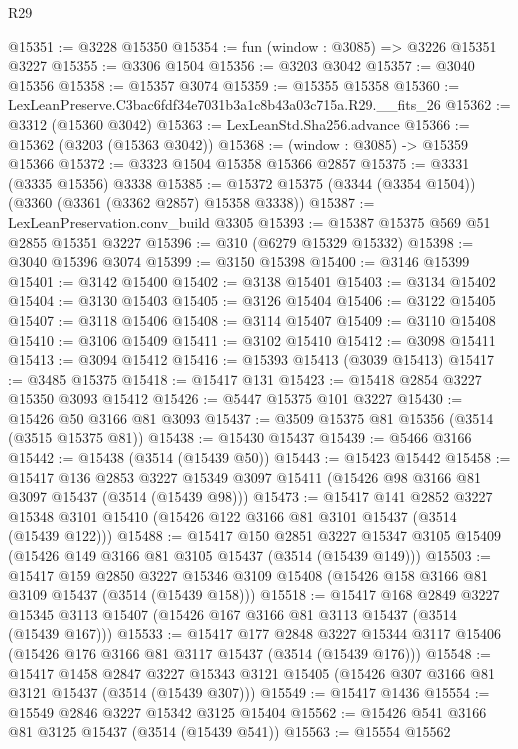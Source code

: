 \begin{lexlean}{R29}
\begin{coremodule}
@15351 := @3228 @15350
@15354 := fun (window : @3085) => @3226 @15351 @3227
@15355 := @3306 @1504
@15356 := @3203 @3042
@15357 := @3040 @15356
@15358 := @15357 @3074
@15359 := @15355 @15358
@15360 := LexLeanPreserve.C3bac6fdf34e7031b3a1c8b43a03c715a.R29.__fits_26
@15362 := @3312 (@15360 @3042)
@15363 := LexLeanStd.Sha256.advance
@15366 := @15362 (@3203 (@15363 @3042))
@15368 := (window : @3085) -> @15359 @15366
@15372 := @3323 @1504 @15358 @15366 @2857
@15375 := @3331 (@3335 @15356) @3338
@15385 := @15372 @15375 (@3344 (@3354 @1504)) (@3360 (@3361 (@3362 @2857) @15358 @3338))
@15387 := LexLeanPreservation.conv_build @3305
@15393 := @15387 @15375 @569 @51 @2855 @15351 @3227
@15396 := @310 (@6279 @15329 @15332)
@15398 := @3040 @15396 @3074
@15399 := @3150 @15398
@15400 := @3146 @15399
@15401 := @3142 @15400
@15402 := @3138 @15401
@15403 := @3134 @15402
@15404 := @3130 @15403
@15405 := @3126 @15404
@15406 := @3122 @15405
@15407 := @3118 @15406
@15408 := @3114 @15407
@15409 := @3110 @15408
@15410 := @3106 @15409
@15411 := @3102 @15410
@15412 := @3098 @15411
@15413 := @3094 @15412
@15416 := @15393 @15413 (@3039 @15413)
@15417 := @3485 @15375
@15418 := @15417 @131
@15423 := @15418 @2854 @3227 @15350 @3093 @15412
@15426 := @5447 @15375 @101 @3227
@15430 := @15426 @50 @3166 @81 @3093
@15437 := @3509 @15375 @81 @15356 (@3514 (@3515 @15375 @81))
@15438 := @15430 @15437
@15439 := @5466 @3166
@15442 := @15438 (@3514 (@15439 @50))
@15443 := @15423 @15442
@15458 := @15417
    @136
    @2853
    @3227
    @15349
    @3097
    @15411
    (@15426 @98 @3166 @81 @3097 @15437 (@3514 (@15439 @98)))
@15473 := @15417
    @141
    @2852
    @3227
    @15348
    @3101
    @15410
    (@15426 @122 @3166 @81 @3101 @15437 (@3514 (@15439 @122)))
@15488 := @15417
    @150
    @2851
    @3227
    @15347
    @3105
    @15409
    (@15426 @149 @3166 @81 @3105 @15437 (@3514 (@15439 @149)))
@15503 := @15417
    @159
    @2850
    @3227
    @15346
    @3109
    @15408
    (@15426 @158 @3166 @81 @3109 @15437 (@3514 (@15439 @158)))
@15518 := @15417
    @168
    @2849
    @3227
    @15345
    @3113
    @15407
    (@15426 @167 @3166 @81 @3113 @15437 (@3514 (@15439 @167)))
@15533 := @15417
    @177
    @2848
    @3227
    @15344
    @3117
    @15406
    (@15426 @176 @3166 @81 @3117 @15437 (@3514 (@15439 @176)))
@15548 := @15417
    @1458
    @2847
    @3227
    @15343
    @3121
    @15405
    (@15426 @307 @3166 @81 @3121 @15437 (@3514 (@15439 @307)))
@15549 := @15417 @1436
@15554 := @15549 @2846 @3227 @15342 @3125 @15404
@15562 := @15426 @541 @3166 @81 @3125 @15437 (@3514 (@15439 @541))
@15563 := @15554 @15562

\end{coremodule}
\end{lexlean}
